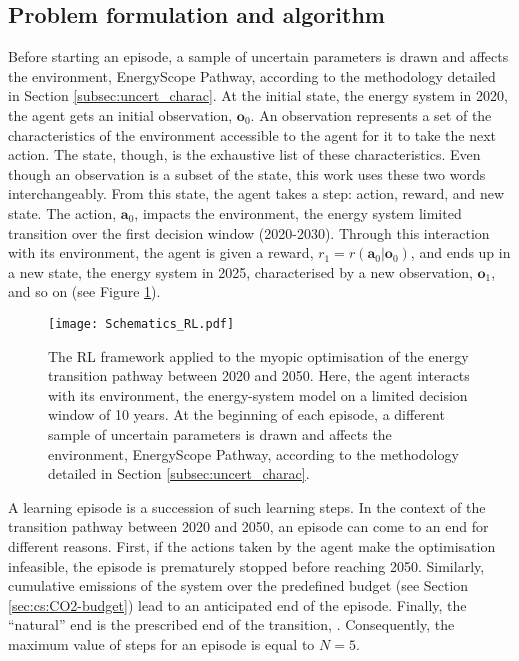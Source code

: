 \subsection{Problem formulation and algorithm}
\label{subsec:meth_RL_algo}
Before starting an episode, a sample of uncertain parameters is drawn and affects the environment, EnergyScope Pathway, according to the methodology detailed in Section \ref{subsec:uncert_charac}. At the initial state, \ie the energy system in 2020, the agent gets an initial observation, $\bm{o}_0$. An observation represents a set of the characteristics of the environment accessible to the agent for it to take the next action. The state, though, is the exhaustive list of these characteristics. Even though an observation is a subset of the state, this work uses these two words interchangeably. From this state, the agent takes a step: action, reward,  and new state. The action, $\bm{a}_0$, impacts the environment, \ie the energy system limited transition over the first decision window (2020-2030). Through this interaction with its environment, the agent is given a reward, $r_1=r\left(\bm{a}_0 | \bm{o}_0 \right)$, and ends up in a new state, \ie the energy system in 2025, characterised by a new observation, $\bm{o}_1$, and so on (see Figure \ref{fig:Schematics_RL}).


\begin{figure}[!htbp]
\centering
\texttt{[image: Schematics\_RL.pdf]}
\caption{The \Acrfull{RL} framework applied to the myopic optimisation of the energy transition pathway between 2020 and 2050. Here, the agent interacts with its environment, \ie the energy-system model on a limited decision window of 10 years. At the beginning of each episode, a different sample of uncertain parameters is drawn and affects the environment, EnergyScope Pathway, according to the methodology detailed in Section \ref{subsec:uncert_charac}.}
\label{fig:Schematics_RL}
\end{figure}

A learning episode is a succession of such learning steps. In the context of the transition pathway between 2020 and 2050, an episode can come to an end for different reasons. First, if the actions taken by the agent make the optimisation infeasible, the episode is prematurely stopped before reaching 2050. Similarly, cumulative emissions of the system over the predefined  budget (see Section \ref{sec:cs:CO2-budget}) lead to an anticipated end of the episode. Finally, the ``natural'' end is the prescribed end of the transition, . Consequently, the maximum value of steps for an episode is equal to $N=5$. 

